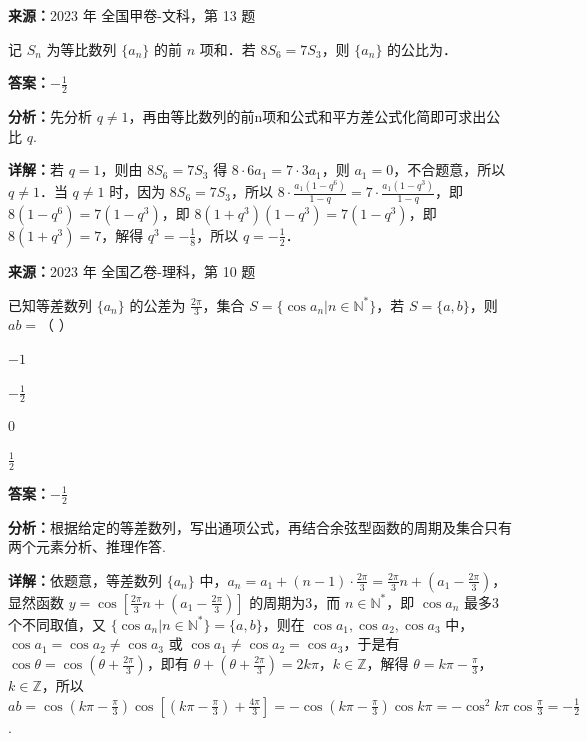 \begin{question}[points=5]
\textbf{来源：}2023 年 全国甲卷-文科，第 13 题\par
记 $S_n$ 为等比数列 $\{a_n\}$ 的前 $n$ 项和．若 $8S_6=7S_3$，则 $\{a_n\}$ 的公比为．
\fillin[{$-\frac{1}{2}$}]
\begin{solution}
\textbf{答案：}$-\frac{1}{2}$

\textbf{分析：}先分析 $q\neq1$，再由等比数列的前n项和公式和平方差公式化简即可求出公比 $q$.

\textbf{详解：}若 $q=1$，则由 $8S_6=7S_3$ 得 $8\cdot6a_1=7\cdot3a_1$，则 $a_1=0$，不合题意，所以 $q\neq1$．当 $q\neq1$ 时，因为 $8S_6=7S_3$，所以 $8\cdot\frac{a_1(1-q^6)}{1-q}=7\cdot\frac{a_1(1-q^3)}{1-q}$，即 $8(1-q^6)=7(1-q^3)$，即 $8(1+q^3)(1-q^3)=7(1-q^3)$，即 $8(1+q^3)=7$，解得 $q^3=-\frac{1}{8}$，所以 $q=-\frac{1}{2}$．
\end{solution}
\end{question}

\begin{question}[points=5]
\textbf{来源：}2023 年 全国乙卷-理科，第 10 题\par
已知等差数列 $\{a_n\}$ 的公差为 $\frac{2\pi}{3}$，集合 $S=\{\cos a_n|n\in\mathbb{N}^*\}$，若 $S=\{a,b\}$，则 $ab=$（ ）
\begin{choices}
  \item $-1$
  \item $-\frac{1}{2}$
  \item $0$
  \item $\frac{1}{2}$
\end{choices}
\begin{solution}
\textbf{答案：}$-\frac{1}{2}$

\textbf{分析：}根据给定的等差数列，写出通项公式，再结合余弦型函数的周期及集合只有两个元素分析、推理作答.

\textbf{详解：}依题意，等差数列 $\{a_n\}$ 中，$a_n=a_1+(n-1)\cdot\frac{2\pi}{3}=\frac{2\pi}{3}n+(a_1-\frac{2\pi}{3})$，显然函数 $y=\cos[\frac{2\pi}{3}n+(a_1-\frac{2\pi}{3})]$ 的周期为3，而 $n\in\mathbb{N}^*$，即 $\cos a_n$ 最多3个不同取值，又 $\{\cos a_n|n\in\mathbb{N}^*\}=\{a,b\}$，则在 $\cos a_1,\cos a_2,\cos a_3$ 中，$\cos a_1=\cos a_2\neq\cos a_3$ 或 $\cos a_1\neq\cos a_2=\cos a_3$，于是有 $\cos\theta=\cos(\theta+\frac{2\pi}{3})$，即有 $\theta+(\theta+\frac{2\pi}{3})=2k\pi$，$k\in\mathbb{Z}$，解得 $\theta=k\pi-\frac{\pi}{3}$，$k\in\mathbb{Z}$，所以 $ab=\cos(k\pi-\frac{\pi}{3})\cos[(k\pi-\frac{\pi}{3})+\frac{4\pi}{3}]=-\cos(k\pi-\frac{\pi}{3})\cos k\pi=-\cos^2 k\pi\cos\frac{\pi}{3}=-\frac{1}{2}$.
\end{solution}
\end{question}

